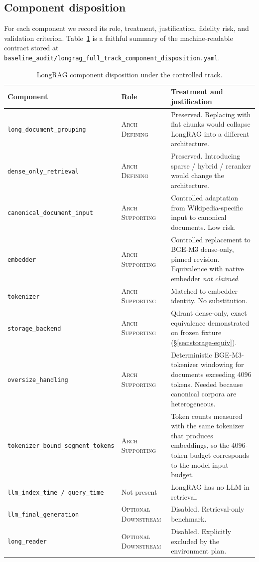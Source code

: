 \documentclass[11pt,a4paper]{article}
\begin{document}
\subsection{Component disposition}
For each component we record its role, treatment, justification,
fidelity risk, and validation criterion. Table~\ref{tab:disposition}
is a faithful summary of the machine-readable contract stored at
\texttt{baseline\_audit/longrag\_full\_track\_component\_disposition.yaml}.

\begin{table}[h]
\centering
\caption{LongRAG component disposition under the controlled track.}
\label{tab:disposition}
\small
\begin{tabular}{p{3.1cm} p{3cm} p{7.9cm}}
\toprule
\textbf{Component} & \textbf{Role} & \textbf{Treatment and justification} \\
\midrule
\texttt{long\_document\_grouping} &
  \textsc{Arch Defining} &
  Preserved. Replacing with flat chunks would collapse LongRAG into a
  different architecture. \\
\texttt{dense\_only\_retrieval} &
  \textsc{Arch Defining} &
  Preserved. Introducing sparse / hybrid / reranker would change the
  architecture. \\
\texttt{canonical\_document\_input} &
  \textsc{Arch Supporting} &
  Controlled adaptation from Wikipedia-specific input to canonical
  documents. Low risk. \\
\texttt{embedder} &
  \textsc{Arch Supporting} &
  Controlled replacement to BGE-M3 dense-only, pinned revision.
  Equivalence with native embedder \emph{not claimed}. \\
\texttt{tokenizer} &
  \textsc{Arch Supporting} &
  Matched to embedder identity. No substitution. \\
\texttt{storage\_backend} &
  \textsc{Arch Supporting} &
  Qdrant dense-only, exact equivalence demonstrated on frozen fixture
  (\S\ref{sec:storage-equiv}). \\
\texttt{oversize\_handling} &
  \textsc{Arch Supporting} &
  Deterministic BGE-M3-tokenizer windowing for documents exceeding
  \SI{4096}{} tokens. Needed because canonical corpora are
  heterogeneous. \\
\texttt{tokenizer\_bound\_segment\_tokens} &
  \textsc{Arch Supporting} &
  Token counts measured with the same tokenizer that produces
  embeddings, so the \SI{4096}{}-token budget corresponds to the
  model input budget. \\
\texttt{llm\_index\_time / query\_time} &
  Not present &
  LongRAG has no LLM in retrieval. \\
\texttt{llm\_final\_generation} &
  \textsc{Optional Downstream} &
  Disabled. Retrieval-only benchmark. \\
\texttt{long\_reader} &
  \textsc{Optional Downstream} &
  Disabled. Explicitly excluded by the environment plan. \\
\bottomrule
\end{tabular}
\end{table}
\end{document}
